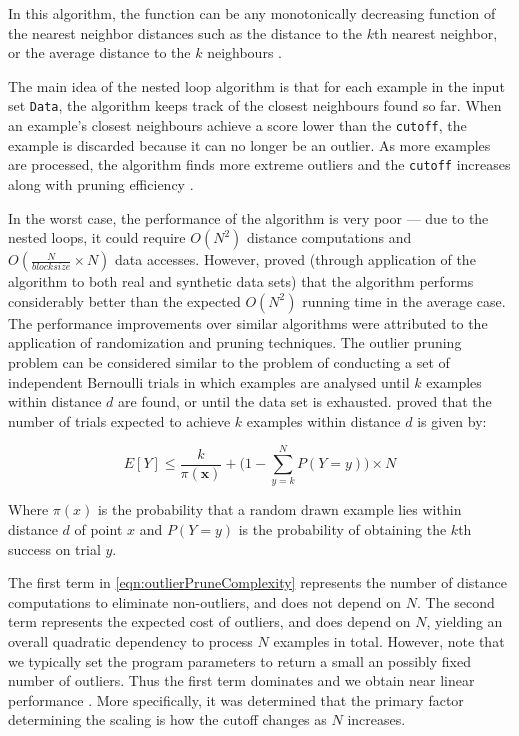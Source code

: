 

In this algorithm, the  function can be any monotonically
decreasing function of the nearest neighbor distances such as the distance to
the $k$th nearest neighbor, or the average distance to the $k$ neighbours
\cite{Bay:2003}.

The main idea of the nested loop algorithm is that for each example in the
input set \verb+Data+, the algorithm keeps track of the closest neighbours found
so far. When an example's closest neighbours achieve a score lower than the
\verb+cutoff+, the example is discarded because it can no longer be an outlier.
As more examples are processed, the algorithm finds more extreme outliers and
the \verb+cutoff+ increases along with pruning efficiency \cite{Bay:2003}.

In the worst case, the performance of the algorithm is very poor --- due to the
nested loops, it could require $O(N^{2})$ distance computations and
$O(\frac{N}{blocksize} \times N)$ data accesses. However, \citeauthor{Bay:2003}
proved (through application of the algorithm to both real and synthetic data
sets) that the algorithm performs considerably better than the expected
$O(N^{2})$ running time in the average case. The performance improvements over
similar algorithms were attributed to the application of randomization and
pruning techniques. The outlier pruning problem can be considered similar to the
problem of conducting a set of independent Bernoulli trials in which examples 
are analysed until $k$ examples within distance $d$ are found, or until the data
set is exhausted. \citeauthor{Bay:2003} proved that the number of trials
expected to achieve $k$ examples within distance $d$ is given by:

\begin{equation}
\label{eqn:outlierPruneComplexity}
E[Y] \leq \frac{k}{\pi(\textbf{x})} + \Bigg(1 - \sum_{y=k}^{N} P(Y=y)\Bigg) \times N
\end{equation}

Where $\pi(x)$ is the probability that a random drawn example lies within 
distance $d$ of point $x$ and $P(Y=y)$ is the probability of obtaining the $k$th
success on trial $y$.

The first term in \autoref{eqn:outlierPruneComplexity} represents the number of
distance computations to eliminate non-outliers, and does not depend on $N$. The
second term represents the expected cost of outliers, and does depend on $N$,
yielding an overall quadratic dependency to process $N$ examples in total.
However, note that we typically set the program parameters to return a small an
possibly fixed number of outliers. Thus the first term dominates and we obtain
near linear performance \cite{Bay:2003}. More specifically, it was determined
that the primary factor determining the scaling is how the cutoff changes as $N$
increases.

